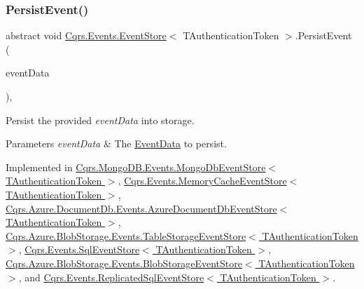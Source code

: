 \subsubsection{\texorpdfstring{Persist\+Event()}{PersistEvent()}}
{\footnotesize\ttfamily abstract void \hyperlink{classCqrs_1_1Events_1_1EventStore}{Cqrs.\+Events.\+Event\+Store}$<$ T\+Authentication\+Token $>$.Persist\+Event (\begin{DoxyParamCaption}\item[{\hyperlink{classCqrs_1_1Events_1_1EventData}{Event\+Data}}]{event\+Data }\end{DoxyParamCaption})\hspace{0.3cm}{\ttfamily [protected]}, {}}



Persist the provided {\itshape event\+Data}  into storage. 


\begin{DoxyParams}{Parameters}
{\em event\+Data} & The \hyperlink{classCqrs_1_1Events_1_1EventData}{Event\+Data} to persist.\\
\hline
\end{DoxyParams}


Implemented in \hyperlink{classCqrs_1_1MongoDB_1_1Events_1_1MongoDbEventStore_a13f6823671d7cb9c042d8f7156a51b89_a13f6823671d7cb9c042d8f7156a51b89}{Cqrs.\+Mongo\+D\+B.\+Events.\+Mongo\+Db\+Event\+Store$<$ T\+Authentication\+Token $>$}, \hyperlink{classCqrs_1_1Events_1_1MemoryCacheEventStore_a9b1a1aaab34770bd68ebcedca0fc40b0_a9b1a1aaab34770bd68ebcedca0fc40b0}{Cqrs.\+Events.\+Memory\+Cache\+Event\+Store$<$ T\+Authentication\+Token $>$}, \hyperlink{classCqrs_1_1Azure_1_1DocumentDb_1_1Events_1_1AzureDocumentDbEventStore_afe494469614082cf667f5cf4b6c4a97b_afe494469614082cf667f5cf4b6c4a97b}{Cqrs.\+Azure.\+Document\+Db.\+Events.\+Azure\+Document\+Db\+Event\+Store$<$ T\+Authentication\+Token $>$}, \hyperlink{classCqrs_1_1Azure_1_1BlobStorage_1_1Events_1_1TableStorageEventStore_ae63921d0ace265b1b269c865080b5712_ae63921d0ace265b1b269c865080b5712}{Cqrs.\+Azure.\+Blob\+Storage.\+Events.\+Table\+Storage\+Event\+Store$<$ T\+Authentication\+Token $>$}, \hyperlink{classCqrs_1_1Events_1_1SqlEventStore_a8d67570d50a97050cbce5a29d7a4b9f6_a8d67570d50a97050cbce5a29d7a4b9f6}{Cqrs.\+Events.\+Sql\+Event\+Store$<$ T\+Authentication\+Token $>$}, \hyperlink{classCqrs_1_1Azure_1_1BlobStorage_1_1Events_1_1BlobStorageEventStore_aa27a352076b8967498407d24814f7c83_aa27a352076b8967498407d24814f7c83}{Cqrs.\+Azure.\+Blob\+Storage.\+Events.\+Blob\+Storage\+Event\+Store$<$ T\+Authentication\+Token $>$}, and \hyperlink{classCqrs_1_1Events_1_1ReplicatedSqlEventStore_aedff93a62c275a18d45ede6576fe2840_aedff93a62c275a18d45ede6576fe2840}{Cqrs.\+Events.\+Replicated\+Sql\+Event\+Store$<$ T\+Authentication\+Token $>$}.

